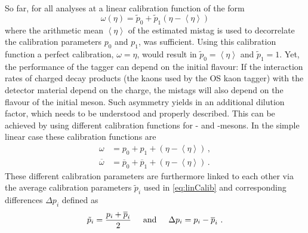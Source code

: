 So far, for all analyses at \lhcb a linear calibration function of the form
\begin{equation}
\omega(\eta)=\tilde{p}_0+\tilde{p}_1\left(\eta-\left<\eta\right>\right)\label{eq:linCalib}
\end{equation}
where the arithmetic mean $\left<\eta\right>$ of the estimated mistag is used to decorrelate the calibration parameters $p_0$ and $p_1$, was sufficient.
Using this calibration function a perfect calibration, \ie $\omega=\eta$, would result in $\tilde{p}_0=\left<\eta\right>$ and $\tilde{p}_1=1$.
Yet, the performance of the tagger can depend on the initial \B flavour:
If the interaction rates of charged decay products (\eg the kaons used by the OS kaon tagger) with the detector material depend on the charge, the mistags will also depend on the flavour of the initial \B meson.
Such asymmetry yields in an additional dilution factor, which needs to be understood and properly described.
This can be achieved by using different calibration functions for \Bz- and \Bzb-mesons.
In the simple linear case these calibration functions are
\begin{equation}
\begin{aligned}
\omega&=p_0+p_1+\left(\eta-\left<\eta\right>\right)\,,\\
\overline{\omega}&=\overline{p}_0+\overline{p}_1+\left(\eta-\left<\eta\right>\right)\,.
\end{aligned}
\end{equation}
These different calibration parameters are furthermore linked to each other via the average calibration parameters $\tilde{p}_i$ used in \cref{eq:linCalib} and corresponding differences $\Delta p_i$ defined as
\begin{equation}
\tilde{p}_i=\frac{p_i+\overline{p}_i}{2}\hspace{0.5cm}\text{and}\hspace{0.5cm}\Delta p_i=p_i-\overline{p}_i\,\,.
\end{equation}

